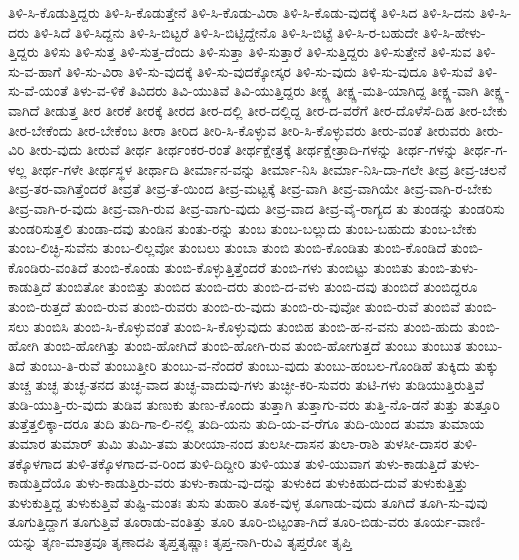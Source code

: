 {ತಿಳಿ-ಸಿ-ಕೊಡುತ್ತಿದ್ದರು
ತಿಳಿ-ಸಿ-ಕೊಡುತ್ತೇನೆ
ತಿಳಿ-ಸಿ-ಕೊಡು-ವಿರಾ
ತಿಳಿ-ಸಿ-ಕೊಡು-ವುದಕ್ಕೆ
ತಿಳಿ-ಸಿದ
ತಿಳಿ-ಸಿ-ದನು
ತಿಳಿ-ಸಿ-ದರು
ತಿಳಿ-ಸಿದೆ
ತಿಳಿ-ಸಿದ್ದನು
ತಿಳಿ-ಸಿ-ಬಿಟ್ಟರೆ
ತಿಳಿ-ಸಿ-ಬಿಟ್ಟಿದ್ದೇನೊ
ತಿಳಿ-ಸಿ-ಬಿಟ್ಟೆ
ತಿಳಿ-ಸಿ-ರ-ಬಹುದೇ
ತಿಳಿ-ಸಿ-ಹೇಳು-ತ್ತಿದ್ದರು
ತಿಳಿಸು
ತಿಳಿ-ಸುತ್ತ
ತಿಳಿ-ಸುತ್ತ-ದೆಂದು
ತಿಳಿ-ಸುತ್ತಾ
ತಿಳಿ-ಸುತ್ತಾರೆ
ತಿಳಿ-ಸುತ್ತಿದ್ದರು
ತಿಳಿ-ಸುತ್ತೇನೆ
ತಿಳಿ-ಸುವ
ತಿಳಿ-ಸು-ವ-ಹಾಗೆ
ತಿಳಿ-ಸು-ವಿರಾ
ತಿಳಿ-ಸು-ವುದಕ್ಕೆ
ತಿಳಿ-ಸು-ವುದಕ್ಕೋಸ್ಕರ
ತಿಳಿ-ಸು-ವುದು
ತಿಳಿ-ಸು-ವುದೂ
ತಿಳಿ-ಸುವೆ
ತಿಳಿ-ಸು-ವೆ-ಯಂತೆ
ತಿಳು-ವ-ಳಿಕೆ
ತಿವಿದರು
ತಿವಿ-ಯುತಿವೆ
ತಿವಿ-ಯುತ್ತಿದ್ದರು
ತೀಕ್ಷ್ಣ
ತೀಕ್ಷ್ಣ-ಮತಿ-ಯಾಗಿದ್ದ
ತೀಕ್ಷ್ಣ-ವಾಗಿ
ತೀಕ್ಷ್ಣ-ವಾಗಿದೆ
ತೀಡುತ್ತ
ತೀರ
ತೀರಕೆ
ತೀರಕ್ಕೆ
ತೀರದ
ತೀರ-ದಲ್ಲಿ
ತೀರ-ದಲ್ಲಿದ್ದ
ತೀರ-ದ-ವರೆಗೆ
ತೀರ-ದೊಳೆಸೆ-ದಿಹ
ತೀರ-ಬೇಕು
ತೀರ-ಬೇಕೆಂದು
ತೀರ-ಬೇಕೆಂಬ
ತೀರಾ
ತೀರಿದ
ತೀರಿ-ಸಿ-ಕೊಳ್ಳುವ
ತೀರಿ-ಸಿ-ಕೊಳ್ಳುವರು
ತೀರು-ವಂತೆ
ತೀರುವರು
ತೀರು-ವಿರಿ
ತೀರು-ವುದು
ತೀರುವೆ
ತೀರ್ಥ
ತೀರ್ಥಂಕರ-ರಂತೆ
ತೀರ್ಥಕ್ಷೇತ್ರಕ್ಕೆ
ತೀರ್ಥಕ್ಷೇತ್ರಾದಿ-ಗಳನ್ನು
ತೀರ್ಥ-ಗಳನ್ನು
ತೀರ್ಥ-ಗ-ಳಲ್ಲ
ತೀರ್ಥ-ಗಳೇ
ತೀರ್ಥಸ್ಥಳ
ತೀರ್ಥಾದಿ
ತೀರ್ಮಾನ-ವನ್ನು
ತೀರ್ಮಾ-ನಿಸಿ
ತೀರ್ಮಾ-ನಿಸಿ-ದಾ-ಗಲೇ
ತೀವ್ರ
ತೀವ್ರ-ಚಲನೆ
ತೀವ್ರ-ತರ-ವಾಗಿತ್ತೆಂದರೆ
ತೀವ್ರತೆ
ತೀವ್ರ-ತೆ-ಯಿಂದ
ತೀವ್ರ-ಮಟ್ಟಕ್ಕೆ
ತೀವ್ರ-ವಾಗಿ
ತೀವ್ರ-ವಾಗಿಯೇ
ತೀವ್ರ-ವಾಗಿ-ರ-ಬೇಕು
ತೀವ್ರ-ವಾಗಿ-ರ-ವುದು
ತೀವ್ರ-ವಾಗಿ-ರುವ
ತೀವ್ರ-ವಾಗು-ವುದು
ತೀವ್ರ-ವಾದ
ತೀವ್ರ-ವೈ-ರಾಗ್ಯದ
ತು
ತುಂಡನ್ನು
ತುಂಡರಿಸು
ತುಂಡರಿಸುತ್ತಲಿ
ತುಂಡಾ-ದವು
ತುಂಡಿನ
ತುಂತು-ರನ್ನು
ತುಂಬ
ತುಂಬ-ಬಲ್ಲುದು
ತುಂಬ-ಬಹುದು
ತುಂಬ-ಬೇಕು
ತುಂಬ-ಲಿಚ್ಛಿ-ಸುವೆನು
ತುಂಬ-ಲಿಲ್ಲವೋ
ತುಂಬಲು
ತುಂಬಾ
ತುಂಬಿ
ತುಂಬಿ-ಕೊಂಡಿತು
ತುಂಬಿ-ಕೊಂಡಿದೆ
ತುಂಬಿ-ಕೊಂಡಿರು-ವಂತಿದೆ
ತುಂಬಿ-ಕೊಂಡು
ತುಂಬಿ-ಕೊಳ್ಳುತ್ತಿತ್ತೆಂದರೆ
ತುಂಬಿ-ಗಳು
ತುಂಬಿಟ್ಟು
ತುಂಬಿತು
ತುಂಬಿ-ತುಳು-ಕಾಡುತ್ತಿದೆ
ತುಂಬಿತೋ
ತುಂಬಿತ್ತು
ತುಂಬಿದ
ತುಂಬಿ-ದರು
ತುಂಬಿ-ದ-ವಳು
ತುಂಬಿ-ದವು
ತುಂಬಿದೆ
ತುಂಬಿದ್ದರೂ
ತುಂಬಿ-ರುತ್ತದೆ
ತುಂಬಿ-ರುವ
ತುಂಬಿ-ರುವರು
ತುಂಬಿ-ರು-ವುದು
ತುಂಬಿ-ರು-ವುವೋ
ತುಂಬಿ-ರುವೆ
ತುಂಬಿವೆ
ತುಂಬಿ-ಸಲು
ತುಂಬಿಸಿ
ತುಂಬಿ-ಸಿ-ಕೊಳ್ಳುವಂತೆ
ತುಂಬಿ-ಸಿ-ಕೊಳ್ಳುವುದು
ತುಂಬಿಹ
ತುಂಬಿ-ಹ-ನ-ವನು
ತುಂಬಿ-ಹುದು
ತುಂಬಿ-ಹೋಗಿ
ತುಂಬಿ-ಹೋಗಿತ್ತು
ತುಂಬಿ-ಹೋಗಿದೆ
ತುಂಬಿ-ಹೋಗಿ-ರುವ
ತುಂಬಿ-ಹೋಗುತ್ತದೆ
ತುಂಬು
ತುಂಬುತ
ತುಂಬು-ತಿದೆ
ತುಂಬು-ತಿ-ರುವೆ
ತುಂಬುತ್ತೀರಿ
ತುಂಬು-ವ-ನೆಂದರೆ
ತುಂಬು-ವುದು
ತುಂಬು-ಹಂಬಲ-ಗೊಂಡಿಹೆ
ತುಕ್ಕಿದು
ತುಕ್ಕು
ತುಚ್ಚ
ತುಚ್ಛ
ತುಚ್ಛ-ತನದ
ತುಚ್ಛ-ವಾದ
ತುಚ್ಛ-ವಾದುವು-ಗಳು
ತುಚ್ಛೀ-ಕರಿ-ಸುವರು
ತುಟಿ-ಗಳು
ತುಡಿಯುತ್ತಿರುತ್ತಿವೆ
ತುಡಿ-ಯುತ್ತಿ-ರು-ವುದು
ತುಡಿವ
ತುಣುಕು
ತುಣು-ಕೊಂದು
ತುತ್ತಾಗಿ
ತುತ್ತಾಗು-ವರು
ತುತ್ತಿ-ನೊ-ಡನೆ
ತುತ್ತು
ತುತ್ತೂರಿ
ತುತ್ತೆತ್ತಲಿಕ್ಕಾ-ದರೂ
ತುದಿ
ತುದಿ-ಗಾ-ಲಿ-ನಲ್ಲಿ
ತುದಿ-ಯನು
ತುದಿ-ಯ-ವ-ರೆಗೂ
ತುದಿ-ಯಿಂದ
ತುಮಾ
ತುಮಾಯ
ತುಮಾರ
ತುಮಾರ್
ತುಮಿ
ತುಮಿ-ತಮ
ತುರೀಯಾ-ನಂದ
ತುಲಸೀ-ದಾಸನ
ತುಲಾ-ರಾಶಿ
ತುಳಸೀ-ದಾಸರ
ತುಳಿ-ತಕ್ಕೊಳಗಾದ
ತುಳಿ-ತಕ್ಕೊಳಗಾದ-ವ-ರಿಂದ
ತುಳಿ-ದಿದ್ದೀರಿ
ತುಳಿ-ಯುತ
ತುಳಿ-ಯುವಾಗ
ತುಳು-ಕಾಡುತ್ತಿದೆ
ತುಳು-ಕಾಡುತ್ತಿದೆಯೊ
ತುಳು-ಕಾಡುತ್ತಿರು-ವರು
ತುಳು-ಕಾಡು-ವು-ದನ್ನು
ತುಳುಕಿದ
ತುಳುಕಿಹುದ-ದುವೆ
ತುಳುಕುತ್ತಿತ್ತು
ತುಳುಕುತ್ತಿದ್ದ
ತುಳುಕುತ್ತಿವೆ
ತುಷ್ಟಿ-ಮಂತಃ
ತುಸು
ತುಹಾರಿ
ತೂಕ-ವುಳ್ಳ
ತೂಗಾಡು-ವುದು
ತೂಗಿದೆ
ತೂಗಿ-ಸು-ವುವು
ತೂಗುತ್ತಿದ್ದಾಗ
ತೂಗುತ್ತಿವೆ
ತೂರಾಡು-ವಂತಿತ್ತು
ತೂರಿ
ತೂರಿ-ಬಿಟ್ಟಂತಾ-ಗಿದೆ
ತೂರಿ-ಬಿಡು-ವರು
ತೂರ್ಯ-ವಾಣಿ-ಯನ್ನು
ತೃಣ-ಮಾತ್ರವೂ
ತೃಣಾದಪಿ
ತೃಪ್ತತೃಷ್ಣಾಃ
ತೃಪ್ತ-ನಾಗಿ-ರುವಿ
ತೃಪ್ತರೋ
ತೃಪ್ತಿ
}
